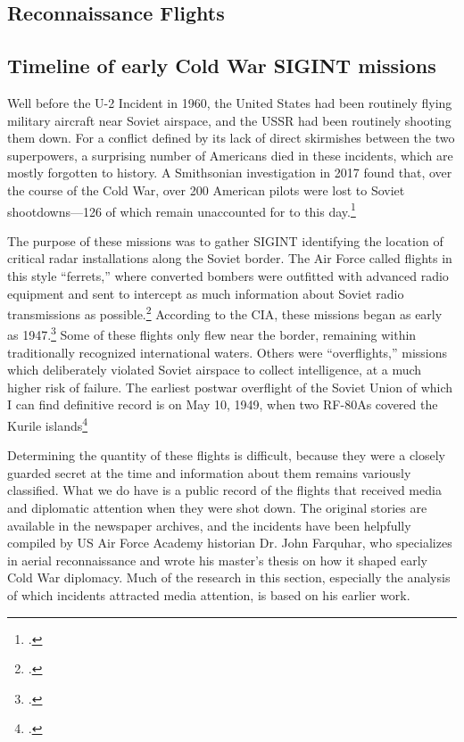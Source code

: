\documentclass{report}
\begin{document}
\begin{refsegment}
\section{Reconnaissance Flights}
\subsection{Timeline of early Cold War SIGINT missions}
Well before the U-2 Incident in 1960, the United States had been routinely flying military aircraft near Soviet airspace, and the USSR had been routinely shooting them down. For a conflict defined by its lack of direct skirmishes between the two superpowers, a surprising number of Americans died in these incidents, which are mostly forgotten to history. A Smithsonian investigation in 2017 found that, over the course of the Cold War, over 200 American pilots were lost to Soviet shootdowns---126 of which remain unaccounted for to this day.\footcite{glenshaw_secret_2017}

The purpose of these missions was to gather SIGINT identifying the location of critical radar installations along the Soviet border. The Air Force called flights in this style ``ferrets,''  where converted bombers were outfitted with advanced radio equipment and sent to intercept as much information about Soviet radio transmissions as possible.\footcite[p.~4]{peterson_maybe_1993} According to the CIA, these missions began as early as 1947.\footcite[p.~4]{peterson_maybe_1993} Some of these flights only flew near the border, remaining within traditionally recognized international waters. Others were ``overflights,'' missions which deliberately violated Soviet airspace to collect intelligence, at a much higher risk of failure. The earliest postwar overflight of the Soviet Union of which I can find definitive record is on May 10, 1949, when two RF-80As covered the Kurile islands\footcite[p.~8]{peebles_shadow_2000}

Determining the quantity of these flights is difficult, because they were a closely guarded secret at the time and information about them remains variously classified. What we do have is a public record of the flights that received media and diplomatic attention when they were shot down. The original stories are available in the newspaper archives, and the incidents have been helpfully compiled by US Air Force Academy historian Dr. John Farquhar, who specializes in aerial reconnaissance and wrote his master's thesis on how it shaped early Cold War diplomacy. Much of the research in this section, especially the analysis of which incidents attracted media attention, is based on his earlier work.
\newline


\end{refsegment}
\end{document}
